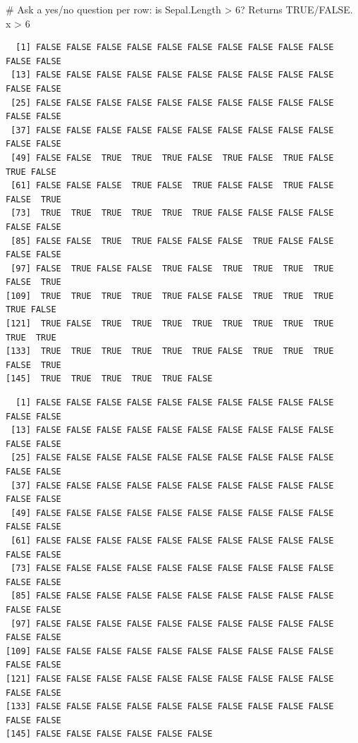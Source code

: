 \documentclass[
  letterpaper,
  DIV=11,
  numbers=noendperiod]{scrreprt}
\newenvironment{Shaded}{\begin{snugshade}}{\end{snugshade}}
\newcommand{\CommentTok}[1]{\textcolor[rgb]{0.37,0.37,0.37}{#1}}
\newcommand{\DecValTok}[1]{\textcolor[rgb]{0.68,0.00,0.00}{#1}}
\newcommand{\NormalTok}[1]{\textcolor[rgb]{0.00,0.23,0.31}{#1}}
\newcommand{\SpecialCharTok}[1]{\textcolor[rgb]{0.37,0.37,0.37}{#1}}
\newcommand{\StringTok}[1]{\textcolor[rgb]{0.13,0.47,0.30}{#1}}
\begin{document}
\begin{Shaded}
\begin{Highlighting}[]
\CommentTok{\# Ask a yes/no question per row: is Sepal.Length \textgreater{} 6? Returns TRUE/FALSE.}
\NormalTok{x }\SpecialCharTok{\textgreater{}} \DecValTok{6}
\end{Highlighting}
\end{Shaded}

\begin{verbatim}
  [1] FALSE FALSE FALSE FALSE FALSE FALSE FALSE FALSE FALSE FALSE FALSE FALSE
 [13] FALSE FALSE FALSE FALSE FALSE FALSE FALSE FALSE FALSE FALSE FALSE FALSE
 [25] FALSE FALSE FALSE FALSE FALSE FALSE FALSE FALSE FALSE FALSE FALSE FALSE
 [37] FALSE FALSE FALSE FALSE FALSE FALSE FALSE FALSE FALSE FALSE FALSE FALSE
 [49] FALSE FALSE  TRUE  TRUE  TRUE FALSE  TRUE FALSE  TRUE FALSE  TRUE FALSE
 [61] FALSE FALSE FALSE  TRUE FALSE  TRUE FALSE FALSE  TRUE FALSE FALSE  TRUE
 [73]  TRUE  TRUE  TRUE  TRUE  TRUE  TRUE FALSE FALSE FALSE FALSE FALSE FALSE
 [85] FALSE FALSE  TRUE  TRUE FALSE FALSE FALSE  TRUE FALSE FALSE FALSE FALSE
 [97] FALSE  TRUE FALSE FALSE  TRUE FALSE  TRUE  TRUE  TRUE  TRUE FALSE  TRUE
[109]  TRUE  TRUE  TRUE  TRUE  TRUE FALSE FALSE  TRUE  TRUE  TRUE  TRUE FALSE
[121]  TRUE FALSE  TRUE  TRUE  TRUE  TRUE  TRUE  TRUE  TRUE  TRUE  TRUE  TRUE
[133]  TRUE  TRUE  TRUE  TRUE  TRUE  TRUE FALSE  TRUE  TRUE  TRUE FALSE  TRUE
[145]  TRUE  TRUE  TRUE  TRUE  TRUE FALSE
\end{verbatim}

\begin{Shaded}
\end{Shaded}

\begin{verbatim}
  [1] FALSE FALSE FALSE FALSE FALSE FALSE FALSE FALSE FALSE FALSE FALSE FALSE
 [13] FALSE FALSE FALSE FALSE FALSE FALSE FALSE FALSE FALSE FALSE FALSE FALSE
 [25] FALSE FALSE FALSE FALSE FALSE FALSE FALSE FALSE FALSE FALSE FALSE FALSE
 [37] FALSE FALSE FALSE FALSE FALSE FALSE FALSE FALSE FALSE FALSE FALSE FALSE
 [49] FALSE FALSE FALSE FALSE FALSE FALSE FALSE FALSE FALSE FALSE FALSE FALSE
 [61] FALSE FALSE FALSE FALSE FALSE FALSE FALSE FALSE FALSE FALSE FALSE FALSE
 [73] FALSE FALSE FALSE FALSE FALSE FALSE FALSE FALSE FALSE FALSE FALSE FALSE
 [85] FALSE FALSE FALSE FALSE FALSE FALSE FALSE FALSE FALSE FALSE FALSE FALSE
 [97] FALSE FALSE FALSE FALSE FALSE FALSE FALSE FALSE FALSE FALSE FALSE FALSE
[109] FALSE FALSE FALSE FALSE FALSE FALSE FALSE FALSE FALSE FALSE FALSE FALSE
[121] FALSE FALSE FALSE FALSE FALSE FALSE FALSE FALSE FALSE FALSE FALSE FALSE
[133] FALSE FALSE FALSE FALSE FALSE FALSE FALSE FALSE FALSE FALSE FALSE FALSE
[145] FALSE FALSE FALSE FALSE FALSE FALSE
\end{verbatim}
\end{document}
